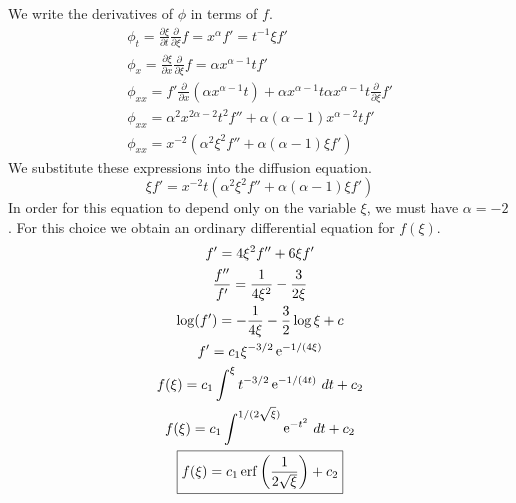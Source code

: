 {%
\begin{Solution}
  We write the derivatives of $\phi$ in terms of $f$.
  \begin{gather*}
    \phi_t = \frac{\partial \xi}{\partial t} \frac{\partial}{\partial \xi} f = x^\alpha f' = t^{-1} \xi f' \\
    \phi_x = \frac{\partial \xi}{\partial x} \frac{\partial}{\partial \xi} f = \alpha x^{\alpha-1} t f' \\
    \phi_{x x} = f' \frac{\partial}{\partial x} \left( \alpha x^{\alpha-1} t \right)
    + \alpha x^{\alpha-1} t \alpha x^{\alpha-1} t \frac{\partial}{\partial \xi} f' \\
    \phi_{x x} = \alpha^2 x^{2 \alpha - 2} t^2 f''
    + \alpha (\alpha-1) x^{\alpha - 2} t f' \\
    \phi_{x x} = x^{-2} \left( \alpha^2 \xi^2 f'' 
      + \alpha (\alpha-1) \xi f' \right)
  \end{gather*}
  We substitute these expressions into the diffusion equation.
  \[
  \xi f' = x^{-2} t \left( \alpha^2 \xi^2 f'' + \alpha (\alpha-1) \xi f' \right)
  \]
  In order for this equation to depend only on the variable $\xi$, we must
  have $\alpha = -2$.  For this choice we obtain an ordinary differential 
  equation for $f(\xi)$.
  \begin{gather*}
    f' = 4 \xi^2 f'' + 6 \xi f' \\
    \frac{f''}{f'} = \frac{1}{4 \xi^2} - \frac{3}{2 \xi} \\
    \log(f') = - \frac{1}{4 \xi} - \frac{3}{2} \log \xi + c \\
    f' = c_1 \xi^{-3/2} \mathop{\mathrm{e}}\nolimits^{-1/(4 \xi)} \\
    f(\xi) = c_1 \int^\xi t^{-3/2} \mathop{\mathrm{e}}\nolimits^{-1/(4 t)} \,d t + c_2 \\
    f(\xi) = c_1 \int^{1/(2\sqrt{\xi})} \mathop{\mathrm{e}}\nolimits^{-t^2} \,d t + c_2 \\
    \boxed{
      f(\xi) = c_1 \mathop{\mathrm{erf}}\nolimits \left( \frac{1}{2 \sqrt{\xi} } \right) + c_2 
      }
  \end{gather*}
\end{Solution}









\raggedbottom
}
